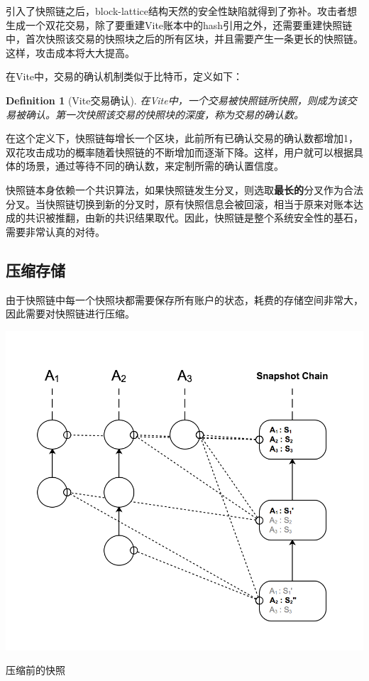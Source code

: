\documentclass[UTF8,nofonts]{ctexart}
\makeatletter
\newtheorem{definition}{Definition}[section]
\newenvironment{figurehere}
 {\def\@captype{figure}}
 {}
\makeatother
\begin{document}
\begin{multicols}{2}
引入了快照链之后，block-lattice结构天然的安全性缺陷就得到了弥补。攻击者想生成一个双花交易，除了要重建Vite账本中的hash引用之外，还需要重建快照链中，首次快照该交易的快照块之后的所有区块，并且需要产生一条更长的快照链。这样，攻击成本将大大提高。

在Vite中，交易的确认机制类似于比特币，定义如下：

\begin{definition}[Vite交易确认]
在Vite中，一个交易被快照链所快照，则成为该交易被确认。第一次快照该交易的快照块的深度，称为交易的确认数。
\end{definition}

在这个定义下，快照链每增长一个区块，此前所有已确认交易的确认数都增加1，双花攻击成功的概率随着快照链的不断增加而逐渐下降。这样，用户就可以根据具体的场景，通过等待不同的确认数，来定制所需的确认置信度。

快照链本身依赖一个共识算法，如果快照链发生分叉，则选取\textbf{最长的}分叉作为合法分叉。当快照链切换到新的分叉时，原有快照信息会被回滚，相当于原来对账本达成的共识被推翻，由新的共识结果取代。因此，快照链是整个系统安全性的基石，需要非常认真的对待。

\subsection{压缩存储}
由于快照链中每一个快照块都需要保存所有账户的状态，耗费的存储空间非常大，因此需要对快照链进行压缩。

\begin{center}
\begin{figurehere}
\includegraphics[width=.7\linewidth]{image/compact-snapshot.png}
\caption{压缩前的快照}
\end{figurehere}
\end{center}


\end{multicols}
\end{document}

